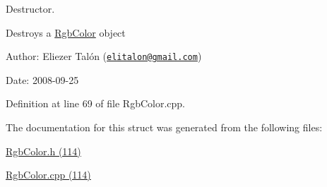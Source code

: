 Destructor. 

Destroys a \hyperlink{struct_rgb_color}{RgbColor} object

\begin{Desc}
\item[Author:]Eliezer Talón (\href{mailto:elitalon@gmail.com}{\tt elitalon@gmail.com}) \end{Desc}
\begin{Desc}
\item[Date:]2008-09-25 \end{Desc}


Definition at line 69 of file RgbColor.cpp.

The documentation for this struct was generated from the following files:\begin{CompactItemize}
\item 
\hyperlink{_rgb_color_8h}{RgbColor.h (114)}\item 
\hyperlink{_rgb_color_8cpp}{RgbColor.cpp (114)}\end{CompactItemize}
